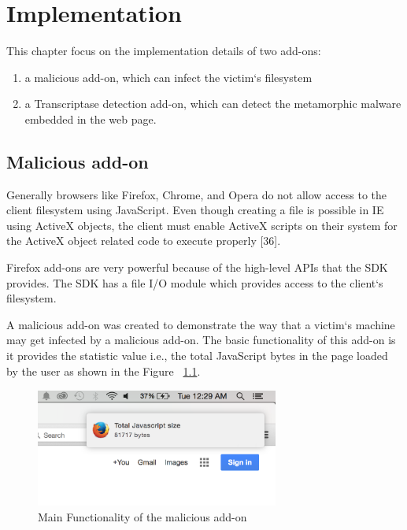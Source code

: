 \chapter{Implementation}

This chapter focus on the implementation details of two add-ons:
\begin{enumerate}
\item a malicious add-on, which can infect the victim`s filesystem
\item a Transcriptase detection add-on, which can detect the metamorphic malware embedded in the web page.
\end{enumerate}

\section{Malicious add-on}

Generally browsers like Firefox, Chrome, and Opera do not allow access to the client filesystem using JavaScript. Even though creating a file is possible in IE using ActiveX objects, the client must enable ActiveX scripts on their system for the ActiveX object related code to execute properly [36]. 

Firefox add-ons are very powerful because of the high-level APIs that the SDK provides. The SDK has a file I/O module which provides access to the client`s filesystem.

A malicious add-on was created to demonstrate the way that a victim`s machine may get infected by a malicious add-on. The basic functionality of this add-on is it provides the statistic value i.e., the total JavaScript bytes in the page loaded by the user as shown in the Figure ~\ref{fig:maliciousaddon}.

\begin{figure}
    \centering    
    \includegraphics[width=8cm, height=3.9cm]{maliciousaddon.png}
    \caption[Main Functionality of the malicious add-on]{Main Functionality of the malicious add-on}
    \label{fig:maliciousaddon}
\end{figure}

